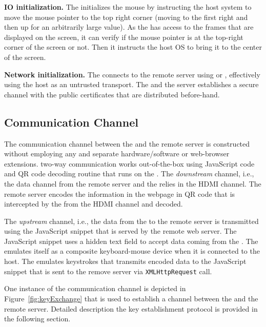 \begin{mylist}
  \item\textbf{IO initialization.} The \device initializes the mouse by instructing the host system to move the mouse pointer to the top right corner (moving to the first right and then up for an arbitrarily large value). As the \device has access to the frames that are displayed on the screen, it can verify if the mouse pointer is at the top-right corner of the screen or not. Then it instructs the host OS to bring it to the center of the screen.
  
  \item\textbf{Network initialization.} The \device connects to the remote server using \webusb or \webbt, effectively using the host as an untrusted transport. The \device and the server establishes a secure channel with the public certificates that are distributed before-hand.
\end{mylist}


\subsection{Communication Channel}
\label{sec:systemDesign:communicationChannel}

The communication channel between the \device and the remote server is constructed without employing any and separate hardware/software or web-browser extensions. \name two-way communication works out-of-the-box using JavaScript code and QR code decoding routine that runs on the \device. The \emph{downstream} channel, i.e., the data channel from the remote server and the \device relies in the HDMI channel. The remote server encodes the information in the webpage in QR code that is intercepted by the \device from the HDMI channel and decoded.

The \emph{upstream} channel, i.e., the data from the \device to the remote server is transmitted using the \name JavaScript snippet that is served by the remote web server. The \name JavaScript snippet uses a hidden text field to accept data coming from the \device. The \device emulates itself as a composite keyboard-mouse device when it is connected to the host. The \device emulates keystrokes that transmits encoded data to the \name JavaScript snippet that is sent to the remove server via \texttt{XMLHttpRequest} call.

One instance of the communication channel is depicted in Figure~\ref{fig:keyExchange} that is used to establish a \tls channel between the \device and the remote server. Detailed description the key establishment protocol is provided in the following section.


